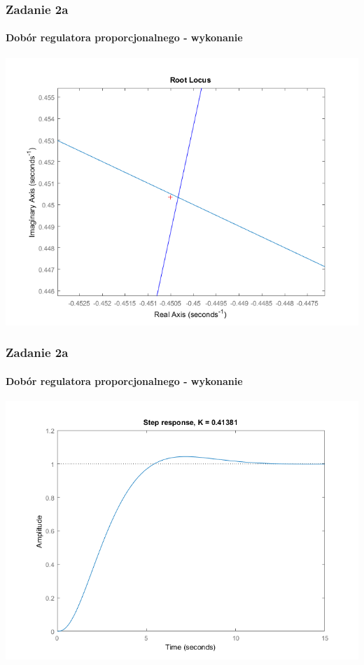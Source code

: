 \documentclass{beamer}
\begin{document}
\begin{frame}\frametitle{Zadanie 2a}\framesubtitle{Dobór regulatora proporcjonalnego - wykonanie}
\centering	\includegraphics[scale=0.5]{a-rlocfind.png}
\end{frame}

\begin{frame}\frametitle{Zadanie 2a}\framesubtitle{Dobór regulatora proporcjonalnego - wykonanie}
\centering	\includegraphics[scale=0.5]{a-sys-zamk-k.png}
\end{frame}

\end{document}
